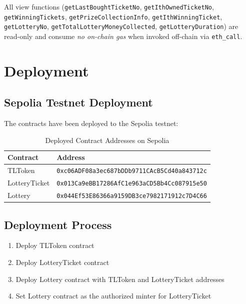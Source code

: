 \documentclass[12pt,a4paper]{article}
\begin{document}
All view functions (\texttt{getLastBoughtTicketNo}, \texttt{getIthOwnedTicketNo},
\texttt{getWinningTickets}, \texttt{getPrizeCollectionInfo}, \texttt{getIthWinningTicket},
\texttt{getLotteryNo}, \texttt{getTotalLotteryMoneyCollected},
\texttt{getLotteryDuration}) are read-only and consume \emph{no on-chain gas}
when invoked off-chain via \texttt{eth\_call}.

\section{Deployment}

\subsection{Sepolia Testnet Deployment}

The contracts have been deployed to the Sepolia testnet:

\begin{table}[H]
    \centering
    \begin{tabular}{@{}ll@{}}
        \toprule
        \textbf{Contract} & \textbf{Address} \\
        \midrule
        TLToken & \texttt{0xc06ADF08a3ec687bDDb9711CAcB5Cd40a843712c} \\
        LotteryTicket & \texttt{0x013Ca9eBB17286AfC1e963aCD5Bb4Cc087915e50} \\
        Lottery & \texttt{0x044Ef53E86366a9159DB3ce7982171912c7D4C66} \\
        \bottomrule
    \end{tabular}
    \caption{Deployed Contract Addresses on Sepolia}
    \label{tab:deployment}
\end{table}

\subsection{Deployment Process}

\begin{enumerate}
    \item Deploy TLToken contract
    \item Deploy LotteryTicket contract
    \item Deploy Lottery contract with TLToken and LotteryTicket addresses
    \item Set Lottery contract as the authorized minter for LotteryTicket
\end{enumerate}
\end{document}
